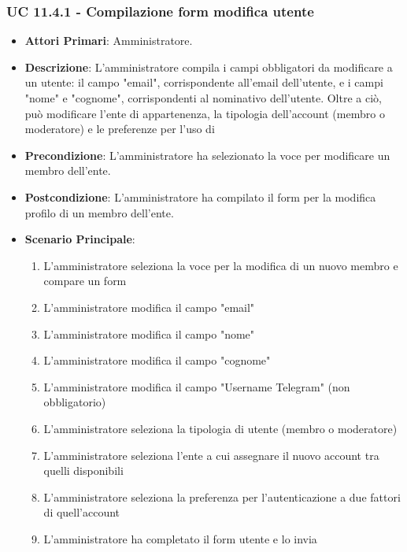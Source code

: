 			\subsubsection{UC 11.4.1 - Compilazione form modifica utente}
			\begin{itemize}
				\item \textbf{Attori Primari}: Amministratore.
				\item \textbf{Descrizione}: L'amministratore compila i campi obbligatori da modificare a un utente: il campo "email", corrispondente all'email dell'utente, e i campi "nome" e "cognome", corrispondenti al nominativo dell'utente. Oltre a ciò, può modificare l'ente di appartenenza, la tipologia dell'account (membro o moderatore) e le preferenze per l'uso di 
				\item \textbf{Precondizione}: L'amministratore ha selezionato la voce per modificare un membro dell'ente.
				\item \textbf{Postcondizione}: L'amministratore ha compilato il form per la modifica profilo di un membro dell'ente.
				\item \textbf{Scenario Principale}:
				\begin{enumerate}
					\item{L'amministratore seleziona la voce per la modifica di un nuovo membro e compare un form}
					\item{L'amministratore modifica il campo "email"}
					\item{L'amministratore modifica il campo "nome"}
					\item{L'amministratore modifica il campo "cognome"}
					\item{L'amministratore modifica il campo "Username Telegram" (non obbligatorio)}
					\item{L'amministratore seleziona la tipologia di utente (membro o moderatore)}
					\item{L'amministratore seleziona l'ente a cui assegnare il nuovo account tra quelli disponibili}
					\item{L'amministratore seleziona la preferenza per l'autenticazione a due fattori di quell'account}
					\item{L'amministratore ha completato il form utente e lo invia}
				\end{enumerate}	
			\end{itemize}


